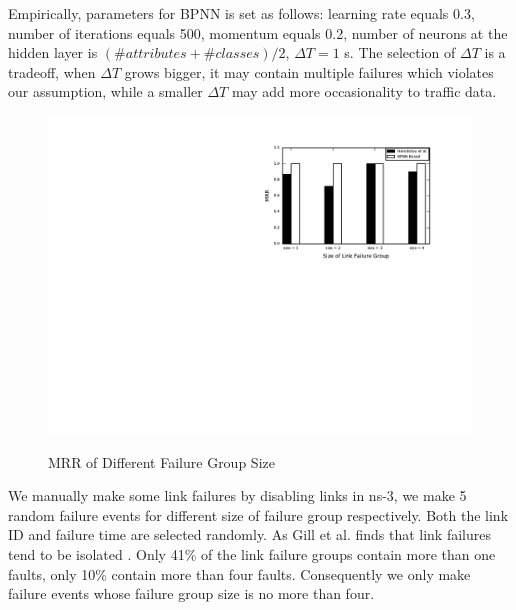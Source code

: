 \documentclass{sig-alternate-05-2015}
\begin{document}
Empirically, parameters for BPNN is set as follows: learning rate equals 0.3, number of iterations equals 500, momentum equals 0.2, number of neurons at the hidden layer is $(\# attributes + \# classes) / 2$, $\Delta T = 1 $ s. The selection of $\Delta T$ is a tradeoff, when $\Delta T$ grows bigger, it may contain multiple failures which violates our assumption, while a smaller $\Delta T$ may add more occasionality to traffic data. 

\begin{figure}
  \centering
  \includegraphics[scale=0.7]{mrr} \\
  \caption{MRR of Different Failure Group Size}
\end{figure}

We manually make some link failures by disabling links in ns-3, we make 5 random failure events for different size of failure group respectively. Both the link ID and failure time are selected randomly. As Gill et al. finds that link failures tend to be isolated \cite{gill2011understanding}. Only 41\% of the link failure groups contain more than one faults, only 10\% contain more than four faults. Consequently we only make failure events whose failure group size is no more than four.
\end{document}
